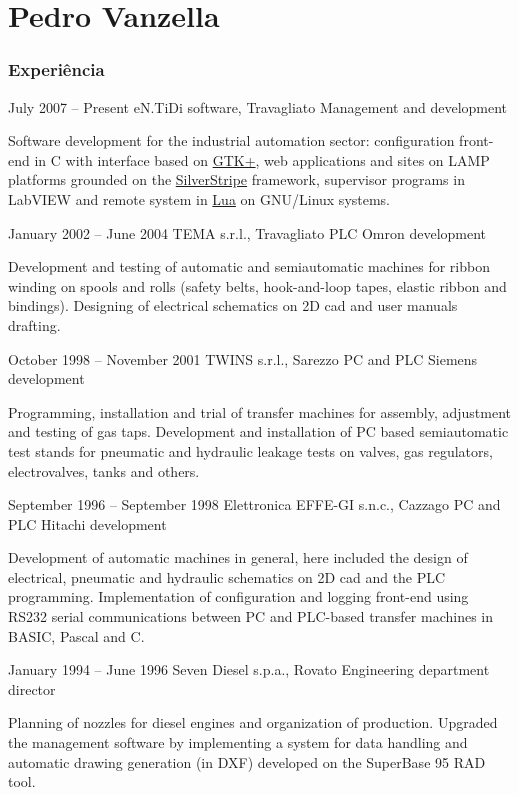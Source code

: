 \documentclass{tccv}
\begin{document}
\part{Pedro Vanzella}

\section{Experiência}

\begin{eventlist}

\item{July 2007 -- Present}
     {eN.TiDi software, Travagliato}
     {Management and development}

Software development for the industrial automation sector: configuration
front-end in C with interface based on \href{http://www.gtk.org/}{GTK+},
web applications and sites on LAMP platforms grounded on the
\href{http://www.silverstripe.org/}{SilverStripe} framework,
supervisor programs in LabVIEW and remote system in
\href{http://www.lua.org/}{Lua} on GNU/Linux systems.

\item{January 2002 -- June 2004}
     {TEMA s.r.l., Travagliato}
     {PLC Omron development}

Development and testing of automatic and semiautomatic machines for
ribbon winding on spools and rolls (safety belts, hook-and-loop tapes,
elastic ribbon and bindings). Designing of electrical schematics on
2D cad and user manuals drafting.

\item{October 1998 -- November 2001}
     {TWINS s.r.l., Sarezzo}
     {PC and PLC Siemens development}

Programming, installation and trial of transfer machines for assembly,
adjustment and testing of gas taps. Development and installation of PC
based semiautomatic test stands for pneumatic and hydraulic leakage
tests on valves, gas regulators, electrovalves, tanks and others.

\item{September 1996 -- September 1998}
     {Elettronica EFFE-GI s.n.c., Cazzago}
     {PC and PLC Hitachi development}

Development of automatic machines in general, here included the design
of electrical, pneumatic and hydraulic schematics on 2D cad and the PLC
programming. Implementation of configuration and logging front-end using
RS232 serial communications between PC and PLC-based transfer machines
in BASIC, Pascal and C.

\item{January 1994 -- June 1996}
     {Seven Diesel s.p.a., Rovato}
     {Engineering department director}

Planning of nozzles for diesel engines and organization of production.
Upgraded the management software by implementing a system for data
handling and automatic drawing generation (in DXF) developed on the
SuperBase 95 RAD tool.

\end{eventlist}
\end{document}
